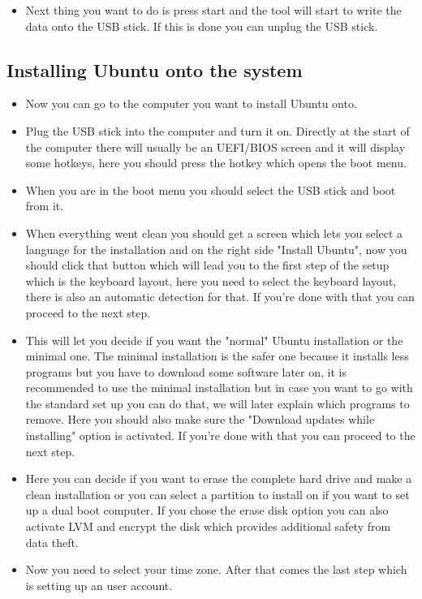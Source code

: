 \documentclass[a4paper,10pt]{article}
\begin{document}
\begin{itemize}[leftmargin=*]

\item Next thing you want to do is press start and the tool will start to write the data onto the USB stick. If this is done you can unplug the USB stick.
\end{itemize}


\subsection{Installing Ubuntu onto the system}
\begin{itemize}[leftmargin=*]
\item Now you can go to the computer you want to install Ubuntu onto.
\item Plug the USB stick into the computer and turn it on. Directly at the start of the computer there will usually be an UEFI/BIOS screen and it will display some hotkeys, here you should press the hotkey which opens the boot menu.
\item When you are in the boot menu you should select the USB stick and boot from it.
\item When everything went clean you should get a screen which lets you select a language for the installation and on the right side "Install Ubuntu", now you should click that button which will lead you to the first step of the setup which is the keyboard layout, here you need to select the keyboard layout, there is also an automatic detection for that. If you're done with that you can proceed to the next step. 
\item This will let you decide if you want the "normal" Ubuntu installation or the minimal one. The minimal installation is the safer one because it installs less programs but you have to download some software later on, it is recommended to use the minimal installation but in case you want to go with the standard set up you can do that, we will later explain which programs to remove. Here you should also make sure the "Download updates while installing" option is activated. If you're done with that you can proceed to the next step.
\item Here you can decide if you want to erase the complete hard drive and make a clean installation or you can select a partition to install on if you want to set up a dual boot computer. If you chose the erase disk option you can also activate LVM and encrypt the disk which provides additional safety from data theft.
\item Now you need to select your time zone. After that comes the last step which is setting up an user account.

\end{itemize}
\end{document}
